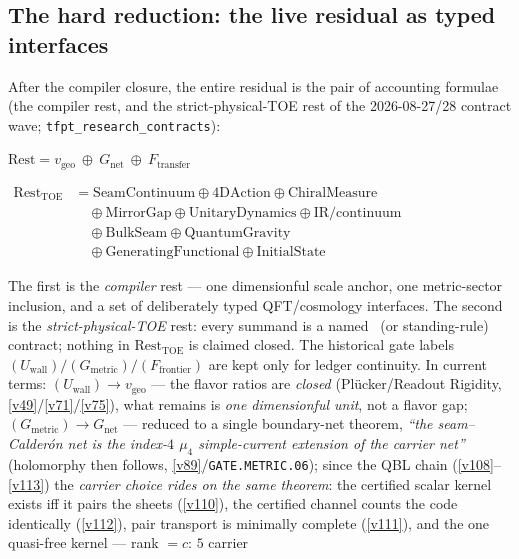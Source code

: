 \documentclass[11pt,a4paper]{article}
\begin{document}
\subsection*{The hard reduction: the live residual as typed interfaces}
\noindent After the compiler closure, the entire residual is the pair of accounting formulae
(the compiler rest, and the strict-physical-TOE rest of the 2026-08-27/28 contract wave;
\texttt{tfpt\_research\_contracts}):
\begin{keyeq}
$\displaystyle \text{Rest}=v_{\mathrm{geo}}\ \oplus\ G_{\mathrm{net}}\ \oplus\ F_{\mathrm{transfer}}$
\end{keyeq}
\begin{keyeq}
$\displaystyle \begin{aligned}
\text{Rest}_{\mathrm{TOE}}&=\mathrm{SeamContinuum}\oplus\mathrm{4DAction}\oplus\mathrm{ChiralMeasure}\\
&\quad\oplus\mathrm{MirrorGap}\oplus\mathrm{UnitaryDynamics}\oplus\mathrm{IR/continuum}\\
&\quad\oplus\mathrm{BulkSeam}\oplus\mathrm{QuantumGravity}\\
&\quad\oplus\mathrm{GeneratingFunctional}\oplus\mathrm{InitialState}
\end{aligned}$
\end{keyeq}
The first is the \emph{compiler} rest --- one dimensionful scale anchor, one metric-sector inclusion, and a set of deliberately typed
QFT/cosmology interfaces.  The second is the \emph{strict-physical-TOE} rest: every summand is a named
\mO\ (or standing-rule) contract; nothing in $\text{Rest}_{\mathrm{TOE}}$ is claimed closed.
The historical gate labels $(U_{\mathrm{wall}})/(G_{\mathrm{metric}})/(F_{\mathrm{frontier}})$ are
kept only for ledger continuity. In current terms: $(U_{\mathrm{wall}})\to v_{\mathrm{geo}}$ --- the flavor ratios are
\emph{closed} (Pl\"ucker/Readout Rigidity, \vref{v49}/\vref{v71}/\vref{v75}), what remains is \emph{one dimensionful unit}, not a
flavor gap; $(G_{\mathrm{metric}})\to G_{\mathrm{net}}$ --- reduced to a single boundary-net theorem,
\emph{``the seam--Calder\'on net is the index-$4$ $\mu_4$ simple-current extension of the carrier net''}
(holomorphy then follows, \vref{v89}/\texttt{GATE.METRIC.06}); since the QBL chain
(\vref{v108}--\vref{v113}) the \emph{carrier choice rides on the same theorem}: the certified scalar kernel exists
iff it pairs the sheets (\vref{v110}), the certified channel counts the code identically (\vref{v112}), pair
transport is minimally complete (\vref{v111}), and the one quasi-free kernel --- rank $=c$: $5$ carrier
\end{document}
